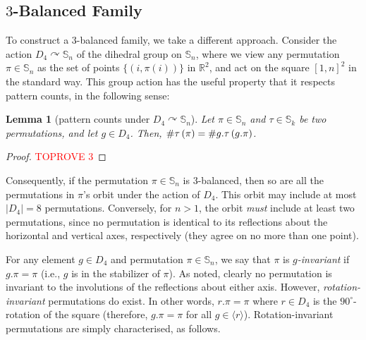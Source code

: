 \documentclass{article}
\newtheorem{lemma}[theorem]{Lemma}
\newcommand{\threeb}{$3$-balanced\xspace}
\newcommand{\Sn}{\mathbb{S}_n}
\newcommand{\RR}{\mathbb{R}}
\newcommand{\pc}[2]{{\# \mathtt{ #1 } \left( #2 \right)}}
\theoremstyle{remark}
\def\acts{\curvearrowright}
\theoremstyle{plain}
\begin{document}
\subsection{\texorpdfstring{$3$}{3}-Balanced Family}
\label{subsect:3bal_construction}

To construct a \threeb family, we take a different approach. Consider the action $D_4 \acts \Sn$ of the dihedral group on $\Sn$, where we view
any permutation $\pi \in \Sn$ as the set of points $\{(i, \pi(i))\}$ in $\RR^2$, and act on the square $[1,n]^2$ in the standard way. This group action has the useful property that it respects pattern counts, in the following sense:

\begin{lemma}[pattern counts under $D_4 \acts \Sn$]
    \label{lemma:pc_D4}
    Let $\pi\in\Sn$ and $\tau\in\mathbb{S}_k$ be two permutations, and let $g \in D_4$. Then,  $\pc{\tau}{\pi} = \pc{\mathnormal{g.\tau}}{g.\pi}$.
\end{lemma}

\begin{proof}\textcolor{red}{TOPROVE 3}\end{proof}

Consequently, if the permutation $\pi \in \mathbb{S}_n$ is $3$-balanced, then so are
all the permutations in $\pi$'s orbit under the action of $D_4$. This orbit may include at most $|D_4| = 8$ permutations. Conversely, for $n > 1$, the orbit \emph{must} include at least two permutations, since no permutation is identical to its reflections about the horizontal and vertical axes, respectively (they agree on no more than one point).

For any element $g \in D_4$ and permutation $\pi \in \Sn$, we say that $\pi$ is \emph{$g$-invariant} if $g.\pi = \pi$ (i.e., $g$ is in the stabilizer of $\pi$). As noted, clearly no permutation is invariant to the involutions of the reflections about either axis. However, \emph{rotation-invariant} permutations do exist. In other words, $r.\pi = \pi$ where $r \in D_4$ is the $90^\circ$-rotation of the square (therefore, $g.\pi = \pi$ for all $g\in \langle r \rangle$). Rotation-invariant permutations are simply characterised, as follows.
\end{document}
